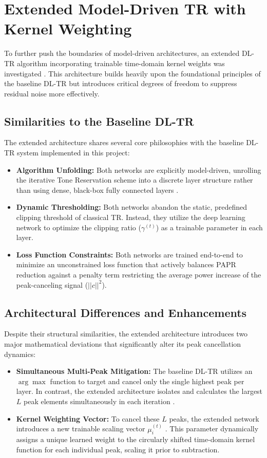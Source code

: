 \section{Extended Model-Driven TR with Kernel Weighting}
To further push the boundaries of model-driven architectures, an extended DL-TR algorithm incorporating trainable time-domain kernel weights was investigated \cite{extended_dl_tr}. This architecture builds heavily upon the foundational principles of the baseline DL-TR but introduces critical degrees of freedom to suppress residual noise more effectively.

\subsection{Similarities to the Baseline DL-TR}
The extended architecture shares several core philosophies with the baseline DL-TR system implemented in this project:
\begin{itemize}
    \item \textbf{Algorithm Unfolding:} Both networks are explicitly model-driven, unrolling the iterative Tone Reservation scheme into a discrete layer structure rather than using dense, black-box fully connected layers \cite{extended_dl_tr}.
    \item \textbf{Dynamic Thresholding:} Both networks abandon the static, predefined clipping threshold of classical TR. Instead, they utilize the deep learning network to optimize the clipping ratio ($\gamma^{(t)}$) as a trainable parameter in each layer.
    \item \textbf{Loss Function Constraints:} Both networks are trained end-to-end to minimize an unconstrained loss function that actively balances PAPR reduction against a penalty term restricting the average power increase of the peak-canceling signal ($||c||^2$).
\end{itemize}

\subsection{Architectural Differences and Enhancements}
Despite their structural similarities, the extended architecture introduces two major mathematical deviations that significantly alter its peak cancellation dynamics:
\begin{itemize}
    \item \textbf{Simultaneous Multi-Peak Mitigation:} The baseline DL-TR utilizes an $\arg\max$ function to target and cancel only the single highest peak per layer. In contrast, the extended architecture isolates and calculates the largest $L$ peak elements simultaneously in each iteration \cite{extended_dl_tr}.
    \item \textbf{Kernel Weighting Vector:} To cancel these $L$ peaks, the extended network introduces a new trainable scaling vector $\mu_{i}^{(t)}$ \cite{extended_dl_tr}. This parameter dynamically assigns a unique learned weight to the circularly shifted time-domain kernel function for each individual peak, scaling it prior to subtraction.
\end{itemize}

